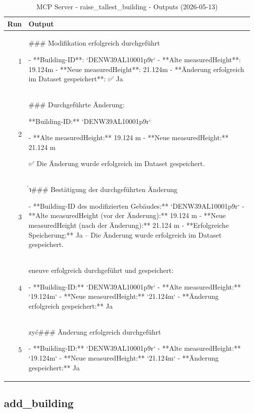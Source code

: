 \documentclass[a4paper,11pt]{article}
\begin{document}
\begin{table}[ht]
\centering
\scriptsize
\caption{MCP Server - raise\_tallest\_building - Outputs (2026-05-13)}
\label{tab:mcp\_raise\_tallest\_building\_outputs\_2026-05-13}
\begin{tabular}{r p{12cm}}
\hline
Run & Output \\
\hline
1 & \#\#\# Modifikation erfolgreich durchgeführt

- **Building-ID**: `DENW39AL10001p9r`
- **Alte measuredHeight**: 19.124m
- **Neue measuredHeight**: 21.124m
- **Änderung erfolgreich im Dataset gespeichert**: ✅ Ja \\
2 & \#\#\# Durchgeführte Änderung:

**Building-ID:** `DENW39AL10001p9r`

- **Alte measuredHeight:** 19.124 m
- **Neue measuredHeight:** 21.124 m

✅ Die Änderung wurde erfolgreich im Dataset gespeichert. \\
3 & ่า\#\#\# Bestätigung der durchgeführten Änderung

- **Building-ID des modifizierten Gebäudes:** `DENW39AL10001p9r`
- **Alte measuredHeight (vor der Änderung):** 19.124 m
- **Neue measuredHeight (nach der Änderung):** 21.124 m
- **Erfolgreiche Speicherung:** Ja – Die Änderung wurde erfolgreich im Dataset gespeichert. \\
4 & eneuve erfolgreich durchgeführt und gespeichert:

- **Building-ID:** `DENW39AL10001p9r`
- **Alte measuredHeight:** `19.124m`
- **Neue measuredHeight:** `21.124m`
- **Änderung erfolgreich gespeichert:** Ja \\
5 & zyć\#\#\# Änderung erfolgreich durchgeführt

- **Building-ID:** `DENW39AL10001p9r`
- **Alte measuredHeight:** `19.124m`
- **Neue measuredHeight:** `21.124m`
- **Änderung gespeichert:** Ja \\
\hline
\end{tabular}
\end{table}

\clearpage
\subsection{add\_building}
\end{document}
